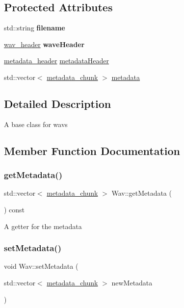 \subsection*{Protected Attributes}
\begin{DoxyCompactItemize}
\item 
\mbox{\label{classWav_a2ca9cee3e37e3292bd04f3e7c1c9b24b}} 
std\+::string {\bfseries filename}
\item 
\mbox{\label{classWav_ab9465cd3b99f1337fa3a77a639dcd9f3}} 
\hyperlink{structwav__header}{wav\+\_\+header} {\bfseries wave\+Header}
\item 
\hyperlink{structmetadata__header}{metadata\+\_\+header} \hyperlink{classWav_a4ddb72dc81101f50ef1f6c4d0e8dc257}{metadata\+Header}
\item 
std\+::vector$<$ \hyperlink{structmetadata__chunk}{metadata\+\_\+chunk} $>$ \hyperlink{classWav_a69b39a8dd2ddd962b6acb966e0f454ee}{metadata}
\end{DoxyCompactItemize}


\subsection{Detailed Description}
A base class for wavs 

\subsection{Member Function Documentation}
\mbox{\label{classWav_ac89cb1f2f327fab3a32d3ba3cd1261f8}} 
\subsubsection{\texorpdfstring{get\+Metadata()}{getMetadata()}}
{\footnotesize\ttfamily std\+::vector$<$ \hyperlink{structmetadata__chunk}{metadata\+\_\+chunk} $>$ Wav\+::get\+Metadata (\begin{DoxyParamCaption}{ }\end{DoxyParamCaption}) const}

A getter for the metadata \mbox{\label{classWav_a597dc2c221a3cdb5da499b91f6e907a6}} 
\subsubsection{\texorpdfstring{set\+Metadata()}{setMetadata()}}
{\footnotesize\ttfamily void Wav\+::set\+Metadata (\begin{DoxyParamCaption}\item[{std\+::vector$<$ \hyperlink{structmetadata__chunk}{metadata\+\_\+chunk} $>$}]{new\+Metadata }\end{DoxyParamCaption})}


